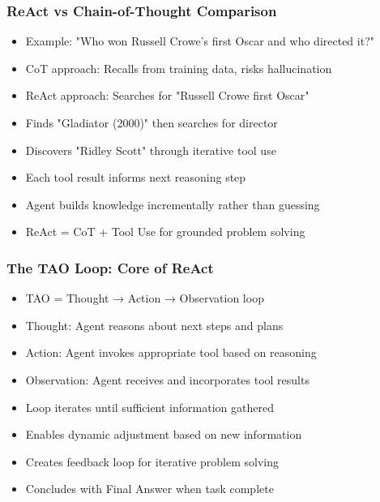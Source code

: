 \begin{frame}[fragile]\frametitle{ReAct vs Chain-of-Thought Comparison}
      \begin{itemize}
	  \item Example: "Who won Russell Crowe's first Oscar and who directed it?"
	  \item CoT approach: Recalls from training data, risks hallucination
	  \item ReAct approach: Searches for "Russell Crowe first Oscar"
	  \item Finds "Gladiator (2000)" then searches for director
	  \item Discovers "Ridley Scott" through iterative tool use
	  \item Each tool result informs next reasoning step
	  \item Agent builds knowledge incrementally rather than guessing
	  \item ReAct = CoT + Tool Use for grounded problem solving
	  \end{itemize}
\end{frame}

\begin{frame}[fragile]\frametitle{The TAO Loop: Core of ReAct}
      \begin{itemize}
	  \item TAO = Thought → Action → Observation loop
	  \item Thought: Agent reasons about next steps and plans
	  \item Action: Agent invokes appropriate tool based on reasoning
	  \item Observation: Agent receives and incorporates tool results
	  \item Loop iterates until sufficient information gathered
	  \item Enables dynamic adjustment based on new information
	  \item Creates feedback loop for iterative problem solving
	  \item Concludes with Final Answer when task complete
	  \end{itemize}
\end{frame}

